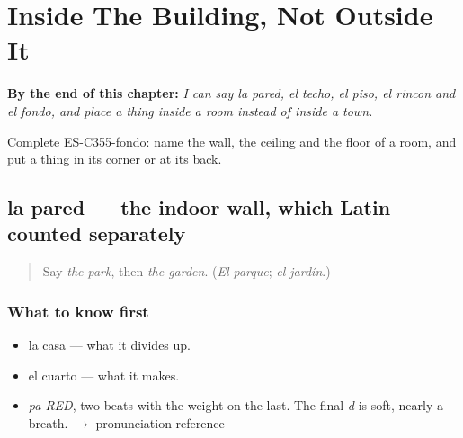 
\chapter{Inside The Building, Not Outside It}
\label{ch:la-pared-y-el-techo}

\begin{chapteropening}
\textbf{By the end of this chapter:} \emph{I can say la pared, el techo, el piso, el rincon and el fondo, and place a thing inside a room instead of inside a town.}

Complete ES-C355-fondo: name the wall, the ceiling and the floor of a room, and put a thing in its corner or at its back.
\end{chapteropening}

\section[la pared]{la pared — the indoor wall, which Latin counted separately}

\label{lesson:ES-C355-pared}



\begin{quote}
Say \emph{the park}, then \emph{the garden}. (\emph{El parque}; \emph{el jardín}.)
\end{quote}

\subsection*{What to know first}
\begin{itemize}
\raggedright
  \item la casa — what it divides up.
  \item el cuarto — what it makes.
\end{itemize}

\begin{sounds}
\begin{itemize}
\raggedright
  \item \emph{pa-RED}, two beats with the weight on the last. The final \emph{d} is soft, nearly a breath. $\to$ pronunciation reference
\end{itemize}
\end{sounds}

